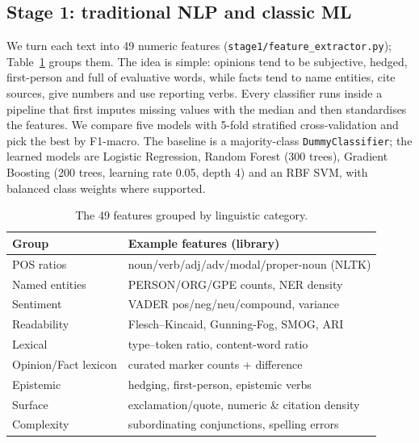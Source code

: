 \documentclass[12pt,a4paper,twocolumn]{article}
\begin{document}
\subsection{Stage 1: traditional NLP and classic ML}
\label{sec:m-stage1}
We turn each text into 49 numeric features
(\texttt{stage1/feature\_extractor.py}); Table~\ref{tab:feats} groups them. The
idea is simple: opinions tend to be subjective, hedged, first-person and full of
evaluative words, while facts tend to name entities, cite sources, give numbers
and use reporting verbs. Every classifier runs inside a pipeline that first
imputes missing values with the median and then standardises the features. We
compare five models with 5-fold stratified cross-validation and pick the best by
F1-macro. The baseline is a majority-class \texttt{DummyClassifier}; the learned
models are Logistic Regression, Random Forest (300 trees), Gradient Boosting
(200 trees, learning rate \num{0.05}, depth 4) and an RBF SVM, with balanced
class weights where supported.

\begin{table}[t]
\centering
\small
\begin{tabular}{@{}ll@{}}
\toprule
\textbf{Group} & \textbf{Example features (library)} \\
\midrule
POS ratios & noun/verb/adj/adv/modal/proper-noun (NLTK) \\
Named entities & PERSON/ORG/GPE counts, NER density \\
Sentiment & VADER pos/neg/neu/compound, variance \\
Readability & Flesch--Kincaid, Gunning-Fog, SMOG, ARI \\
Lexical & type--token ratio, content-word ratio \\
Opinion/Fact lexicon & curated marker counts + difference \\
Epistemic & hedging, first-person, epistemic verbs \\
Surface & exclamation/quote, numeric \& citation density \\
Complexity & subordinating conjunctions, spelling errors \\
\bottomrule
\end{tabular}
\caption{The 49 features grouped by linguistic category.}
\label{tab:feats}
\end{table}
\end{document}
